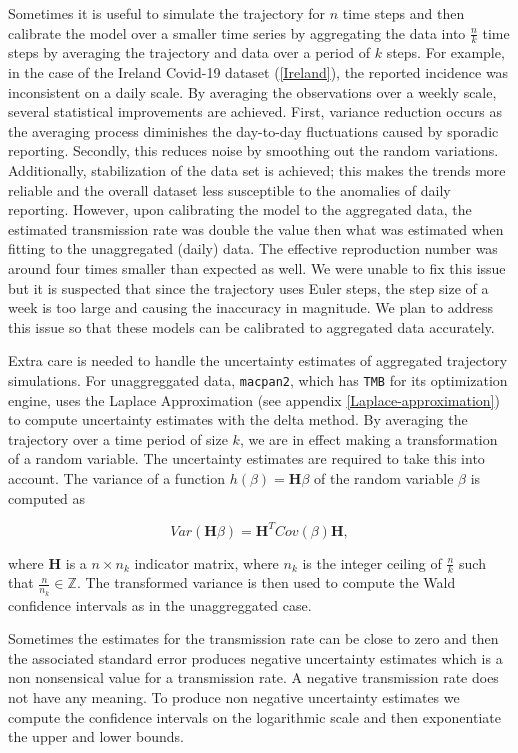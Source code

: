 \documentclass[
11pt, %
oneside, %
english, %
singlespacing, %
]{macthesis} %
\begin{document}
Sometimes it is useful to simulate the trajectory for \(n\) time steps and then calibrate the model over a smaller time series by aggregating the data into \(\frac{n}{k}\) time steps by averaging the trajectory and data over a period of \(k\) steps. For example, in the case of the Ireland Covid-19 dataset (\ref{Ireland}), the reported incidence was inconsistent on a daily scale. By averaging the observations over a weekly scale, several statistical improvements are achieved. First, variance reduction occurs as the averaging process diminishes the day-to-day fluctuations caused by sporadic reporting. Secondly, this reduces noise by smoothing out the random variations. Additionally, stabilization of the data set is achieved; this makes the trends more reliable and the overall dataset less susceptible to the anomalies of daily reporting. However, upon calibrating the model to the aggregated data, the estimated transmission rate was double the value then what was estimated when fitting to the unaggregated (daily) data. The effective reproduction number was around four times smaller than expected as well. We were unable to fix this issue but it is suspected that since the trajectory uses Euler steps, the step size of a week is too large and causing the inaccuracy in magnitude. We plan to address this issue so that these models can be calibrated to aggregated data accurately.

Extra care is needed to handle the uncertainty estimates of aggregated trajectory simulations. For unaggreggated data, \texttt{macpan2}, which has \texttt{TMB} for its optimization engine, uses the Laplace Approximation (see appendix \ref{Laplace-approximation}) to compute uncertainty estimates with the delta method. By averaging the trajectory over a time period of size \(k\), we are in effect making a transformation of a random variable. The uncertainty estimates are required to take this into account. The variance of a function \(h(\beta) = \mathbf{H} \beta\) of the random variable \(\beta\) is computed as

\[
Var(\mathbf{H} \beta) = \mathbf{H}^T Cov(\beta) \mathbf{H},
\]

where \(\mathbf{H}\) is a \(n \times n_k\) indicator matrix, where \(n_k\) is the integer ceiling of \(\frac{n}{k}\) such that \(\frac{n}{n_k} \in \mathbb{Z}\). The transformed variance is then used to compute the Wald confidence intervals as in the unaggreggated case.

Sometimes the estimates for the transmission rate can be close to zero and then the associated standard error produces negative uncertainty estimates which is a non nonsensical value for a transmission rate. A negative transmission rate does not have any meaning. To produce non negative uncertainty estimates we compute the confidence intervals on the logarithmic scale and then exponentiate the upper and lower bounds.
\end{document}

